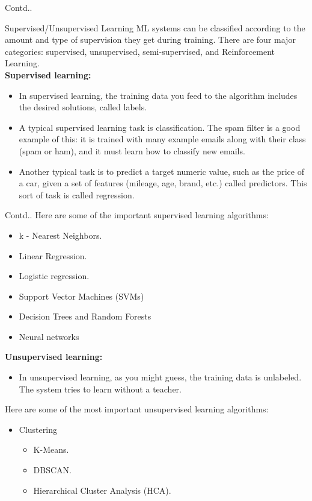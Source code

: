 \documentclass{beamer}
\begin{document}
\begin{frame}{Contd..}
\begin{block}{Supervised/Unsupervised Learning}
ML systems can be classified according to the amount and type of supervision they get during training. There are four major categories: supervised, unsupervised, semi-supervised, and Reinforcement Learning.\\
\vspace{5pt}
\textbf{Supervised learning:}\\
\begin{itemize}
    \item In supervised learning, the training data you feed to the algorithm includes the desired solutions, called labels.
    \item A typical supervised learning task is classification. The spam filter is a good example of this: it is trained with many example emails along with their class (spam or ham), and it must learn how to classify new emails.
    \item Another typical task is to predict a target numeric value, such as the price of a car, given a set of features (mileage, age, brand, etc.) called predictors. This sort of task is called regression.
\end{itemize}
\end{block}
\end{frame}
\begin{frame}
\begin{block}{Contd..}
Here are some of the important supervised learning algorithms:\\
\begin{itemize}
    \item k - Nearest Neighbors.
    \item Linear Regression.
    \item Logistic regression.
    \item Support Vector Machines (SVMs)
    \item Decision Trees and Random Forests
    \item Neural networks
\end{itemize}
\textbf{Unsupervised learning:}\\
\begin{itemize}
    \item In unsupervised learning, as you might guess, the training data is unlabeled. The system tries to learn without a teacher.
\end{itemize}
Here are some of the most important unsupervised learning algorithms:
\begin{itemize}
    \item Clustering
    \begin{itemize}
        \item K-Means.
        \item DBSCAN.
        \item Hierarchical Cluster Analysis (HCA).
    \end{itemize}
\end{itemize}
\end{block}
\end{frame}
\end{document}
